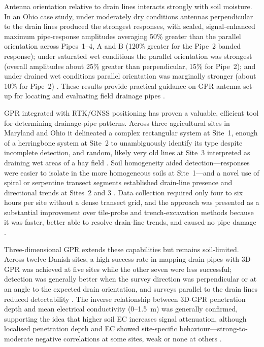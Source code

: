 \documentclass[11pt]{article}
\begin{document}
Antenna orientation relative to drain lines interacts strongly with soil moisture. In an Ohio case study, under moderately dry conditions antennas perpendicular to the drain lines produced the strongest responses, with scaled, signal-enhanced maximum pipe-response amplitudes averaging 50\% greater than the parallel orientation across Pipes~1--4, A and B (120\% greater for the Pipe~2 banded response); under saturated wet conditions the parallel orientation was strongest (overall amplitudes about 25\% greater than perpendicular, 15\% for Pipe~2); and under drained wet conditions parallel orientation was marginally stronger (about 10\% for Pipe~2) \parencite{Allred2013}. These results provide practical guidance on GPR antenna set-up for locating and evaluating field drainage pipes \parencite{Allred2013}.

GPR integrated with RTK/GNSS positioning has proven a valuable, efficient tool for determining drainage-pipe patterns. Across three agricultural sites in Maryland and Ohio it delineated a complex rectangular system at Site~1, enough of a herringbone system at Site~2 to unambiguously identify its type despite incomplete detection, and random, likely very old lines at Site~3 interpreted as draining wet areas of a hay field \parencite{Allred2018b}. Soil homogeneity aided detection---responses were easier to isolate in the more homogeneous soils at Site~1---and a novel use of spiral or serpentine transect segments established drain-line presence and directional trends at Sites~2 and 3 \parencite{Allred2018b}. Data collection required only four to six hours per site without a dense transect grid, and the approach was presented as a substantial improvement over tile-probe and trench-excavation methods because it was faster, better able to resolve drain-line trends, and caused no pipe damage \parencite{Allred2018b}.

Three-dimensional GPR extends these capabilities but remains soil-limited. Across twelve Danish sites, a high success rate in mapping drain pipes with 3D-GPR was achieved at five sites while the other seven were less successful; detection was generally better when the survey direction was perpendicular or at an angle to the expected drain orientation, and surveys parallel to the drain lines reduced detectability \parencite{Koganti2020}. The inverse relationship between 3D-GPR penetration depth and mean electrical conductivity (0--1.5~m) was generally confirmed, supporting the idea that higher soil EC increases signal attenuation, although localised penetration depth and EC showed site-specific behaviour---strong-to-moderate negative correlations at some sites, weak or none at others \parencite{Koganti2020}.
\end{document}
